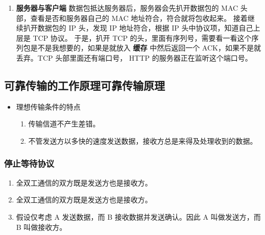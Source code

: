 \documentclass[11pt]{article}
\begin{document}
\begin{enumerate}
知道对方的 IP 地址之后，接下来需要通过 ARP 协议根据 IP 地址查询 MAC 地址，并将查询的结果作为接收方 MAC 地址。
路由器也有 ARP 缓存，因此首先会在 ARP 缓存中查询，如果找不到则发送 ARP 查询请求。
接下来是发送方 MAC 地址字段，这里填写输出端口的 MAC 地址。还有一个以太类型字段，填写 0800 （十六进制）表示 IP 协议。
网络包完成后，接下来会将其转换成电信号并通过端口发送出去。这一步的工作过程和计算机也是相同的。
发送出去的网络包会通过交换机到达下一个路由器。由于接收方 MAC 地址就是下一个路由器的地址，所以交换机会根据这一地址将包传输到下一个路由器。
接下来，下一个路由器会将包转发给再下一个路由器，经过层层转发之后，网络包就到达了最终的目的地。
在网络包传输的过程中，源 IP 和目标 IP 始终是不会变的，一直变化的是 MAC 地址，因为需要 MAC 地址在以太网内进行两个设备之间的包传输。
\item \textbf{服务器与客户端}
数据包抵达服务器后，服务器会先扒开数据包的 MAC 头部，查看是否和服务器自己的 MAC 地址符合，符合就将包收起来。
接着继续扒开数据包的 IP 头，发现 IP 地址符合，根据 IP 头中协议项，知道自己上层是 TCP 协议。
于是，扒开 TCP 的头，里面有序列号，需要看一看这个序列包是不是我想要的，如果是就放入 \textbf{缓存} 中然后返回一个 ACK，如果不是就丢弃。TCP 头部里面还有端口号， HTTP 的服务器正在监听这个端口号。
\end{enumerate}
\subsection{可靠传输的工作原理\hfill{}\textsc{可靠传输原理}}
\label{sec:org4352ee3}

\begin{itemize}
\item 理想传输条件的特点
\begin{enumerate}
\item 传输信道不产生差错。
\item 不管发送方以多快的速度发送数据，接收方总是来得及处理收到的数据。
\end{enumerate}
\end{itemize}
\subsubsection{停止等待协议}
\label{sec:org5c9b519}
\begin{enumerate}
\item 全双工通信的双方既是发送方也是接收方。
\item 全双工通信的双方既是发送方也是接收方。
\item 假设仅考虑 A 发送数据，而 B 接收数据并发送确认。因此 A 叫做发送方，而 B 叫做接收方。
\end{enumerate}
\end{document}
